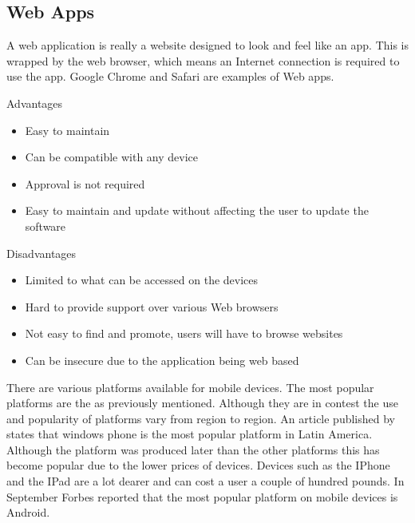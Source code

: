 \subsection{Web Apps}

A web application is really a website designed to look and feel like an app.
This is wrapped by the web browser, which means an Internet connection is
required to use the app. Google Chrome and Safari are examples of Web apps.

Advantages

\begin{itemize}
    \item Easy to maintain
    \item Can be compatible with any device
    \item Approval is not required
    \item Easy to maintain and update without affecting the user to update the
    software
\end{itemize}

Disadvantages

\begin{itemize}
    \item Limited to what can be accessed on the devices
    \item Hard to provide support over various Web browsers
    \item Not easy to find and promote, users will have to browse websites
    \item Can be insecure due to the application being web based
\end{itemize}

There are various platforms available for mobile devices. The most popular
platforms are the as previously mentioned. Although they are in contest the use
and popularity of platforms vary from region to region. An article published by
\citet{wpcentral13} states that windows phone is the most popular platform in
Latin America. Although the platform was produced later than the other platforms
this has become popular due to the lower prices of devices. Devices such as the
IPhone and the IPad are a lot dearer and can cost a user a couple of hundred
pounds. In September Forbes reported that the most popular platform on mobile
devices is Android.

